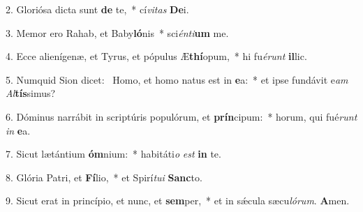 2. Gloriósa dicta sunt \textbf{de} te,~*  cí\textit{vi}\textit{tas} \textbf{De}i.\

3. Memor ero Rahab, et Baby\textbf{ló}nis~*  sci\textit{én}\textit{ti}\textbf{um} me.\

4. Ecce alienígenæ, et Tyrus, et pópulus Æ\textbf{thí}opum,~*  hi fu\textit{é}\textit{runt} \textbf{il}lic.\

5. Numquid Sion dicet: \dag\  Homo, et homo natus est in \textbf{e}a:~*  et ipse fundávit e\textit{am} \textit{Al}\textbf{tís}simus?\

6. Dóminus narrábit in scriptúris populórum, et \textbf{prín}cipum:~*  horum, qui fué\textit{runt} \textit{in} \textbf{e}a.\

7. Sicut lætántium \textbf{óm}nium:~*  habitáti\textit{o} \textit{est} \textbf{in} te.\

8. Glória Patri, et \textbf{Fí}lio,~*  et Spirí\textit{tu}\textit{i} \textbf{Sanc}to.\

9. Sicut erat in princípio, et nunc, et \textbf{sem}per,~*  et in sǽcula sæcu\textit{ló}\textit{rum}. \textbf{A}men.\

